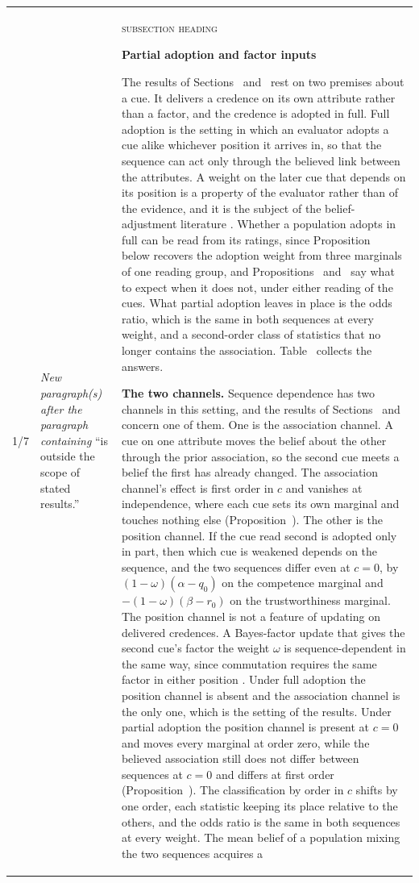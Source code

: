\documentclass[10pt]{article}
\theoremstyle{definition}
\renewcommand{\ref}[1]{\textsc{\detokenize{#1}}}
\begin{document}
{\begin{longtable}{|p{0.9cm}|p{12.2cm}|p{12.2cm}|}
1/7 & \textit{New paragraph(s) after the paragraph containing} ``is outside the scope of stated results.'' & \textsc{subsection heading}\par\textbf{\large Partial adoption and factor inputs}\par  \par The results of Sections~\ref{sec:individual} and~\ref{sec:aggregation} rest on two premises about a cue. It delivers a credence on its own attribute rather than a factor, and the credence is adopted in full. Full adoption is the setting in which an evaluator adopts a cue alike whichever position it arrives in, so that the sequence can act only through the believed link between the attributes. A weight on the later cue that depends on its position is a property of the evaluator rather than of the evidence, and it is the subject of the belief-adjustment literature \citep{HogarthEinhorn1992}. Whether a population adopts in full can be read from its ratings, since Proposition~\ref{prop:ADJ} below recovers the adoption weight from three marginals of one reading group, and Propositions~\ref{prop:LAD} and~\ref{prop:FAC} say what to expect when it does not, under either reading of the cues. What partial adoption leaves in place is the odds ratio, which is the same in both sequences at every weight, and a second-order class of statistics that no longer contains the association. Table~\ref{tab:robust} collects the answers. \par \textbf{The two channels.}  Sequence dependence has two channels in this setting, and the results of Sections~\ref{sec:individual} and~\ref{sec:aggregation} concern one of them. One is the association channel. A cue on one attribute moves the belief about the other through the prior association, so the second cue meets a belief the first has already changed. The association channel's effect is first order in $c$ and vanishes at independence, where each cue sets its own marginal and touches nothing else (Proposition~\ref{prop:IMM}). The other is the position channel. If the cue read second is adopted only in part, then which cue is weakened depends on the sequence, and the two sequences differ even at $c=0$, by $(1-\omega)(\alpha-q_0)$ on the competence marginal and $-(1-\omega)(\beta-r_0)$ on the trustworthiness marginal. The position channel is not a feature of updating on delivered credences. A Bayes-factor update that gives the second cue's factor the weight $\omega$ is sequence-dependent in the same way, since commutation requires the same factor in either position \citep{Wagner2002}. Under full adoption the position channel is absent and the association channel is the only one, which is the setting of the results. Under partial adoption the position channel is present at $c=0$ and moves every marginal at order zero, while the believed association still does not differ between sequences at $c=0$ and differs at first order (Proposition~\ref{prop:LAD}). The classification by order in $c$ shifts by one order, each statistic keeping its place relative to the others, and the odds ratio is the same in both sequences at every weight. The mean belief of a population mixing the two sequences acquires a 
\end{longtable}}
\end{document}
